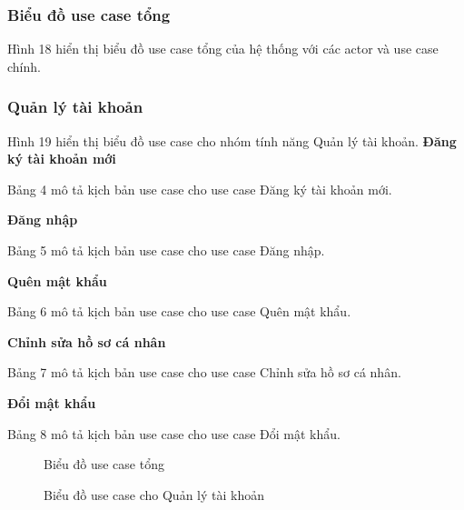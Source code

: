 \subsubsection{Biểu đồ use case tổng}

Hình 18 hiển thị biểu đồ use case tổng của hệ thống với các actor và use case chính.
\subsubsection{Quản lý tài khoản}
Hình 19 hiển thị biểu đồ use case cho nhóm tính năng Quản lý tài khoản.
\textbf{Đăng ký tài khoản mới}

Bảng 4 mô tả kịch bản use case cho use case Đăng ký tài khoản mới.

\textbf{Đăng nhập}

Bảng 5 mô tả kịch bản use case cho use case Đăng nhập.

\textbf{Quên mật khẩu}

Bảng 6 mô tả kịch bản use case cho use case Quên mật khẩu.

\textbf{Chỉnh sửa hồ sơ cá nhân}

Bảng 7 mô tả kịch bản use case cho use case Chỉnh sửa hồ sơ cá nhân.

\textbf{Đổi mật khẩu}

Bảng 8 mô tả kịch bản use case cho use case Đổi mật khẩu.

\begin{figure}[H]
    \centering
     
    \vspace{0.5cm}
    \caption{Biểu đồ use case tổng}
    \label{fig:enter-label}
\end{figure}


\begin{figure}[H]
    \centering
     
    \vspace{0.5cm}
    \caption{Biểu đồ use case cho Quản lý tài khoản}
    \label{fig:enter-label}
\end{figure}








